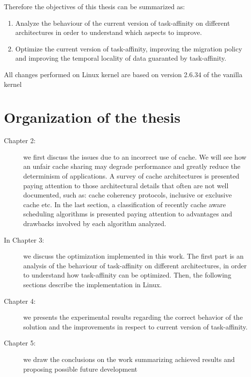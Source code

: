 Therefore the objectives of this thesis can be summarized as:

\begin{enumerate}
\item Analyze the behaviour of the current version of task-affinity on different architectures in order to understand which aspects to improve.
\item Optimize the current version of task-affinity, improving the migration policy and improving the temporal locality of data guaranted by task-affinity.
\end{enumerate}

All changes performed on Linux kernel are based on version 2.6.34 of the vanilla kernel

\section{Organization of the thesis}
\label{sec:OrganizationThesis}

\begin{description}

\item [Chapter 2:] we first discuss the issues due to an incorrect use of cache. We will see how an unfair cache sharing may degrade performance and 
greatly reduce the determinism of applications. A survey of cache architectures is presented paying attention to those architectural details that often 
are not well documented, such as: cache coherency protocols, inclusive or exclusive cache etc. In the last section, a classification of recently cache 
aware scheduling algorithms is presented paying attention to advantages and drawbacks involved by each algorithm analyzed.

\item [In Chapter 3:] we discuss the optimization implemented in this work. The first part is an analysis of the behaviour of task-affinity on different 
architectures, in order to understand how task-affinity can be optimized. Then,
the following sections describe the implementation in Linux.

\item [Chapter 4:] we presents the experimental results regarding the correct behavior of the solution and the improvements in respect to current version of
task-affinity.

\item [ Chapter 5:] we draw the conclusions on the work summarizing achieved results and proposing possible future development

\end{description}

